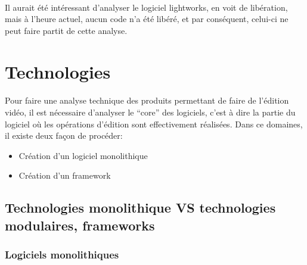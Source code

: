 \paragraph{}

Il aurait été intéressant d'analyser le logiciel lightworks, en voit de libération,
mais à l'heure actuel, aucun code n'a été libéré, et par conséquent, celui-ci ne
peut faire partit de cette analyse.

\newpage

\section{Technologies}

\paragraph{}

Pour faire une analyse technique des produits permettant de faire
de l'édition vidéo, il est nécessaire d'analyser le ``core'' des
logiciels, c'est à dire la partie du logiciel où les opérations
d'édition sont effectivement réalisées. Dans ce domaines, il existe
deux façon de procéder:

\begin{itemize} \setlength{\itemsep}{2mm}

  \item{Création d'un logiciel monolithique}

  \item{Création d'un framework  }

\end{itemize}

\subsection {Technologies monolithique VS technologies modulaires,
frameworks}

\subsubsection{Logiciels monolithiques} %

\paragraph{}

